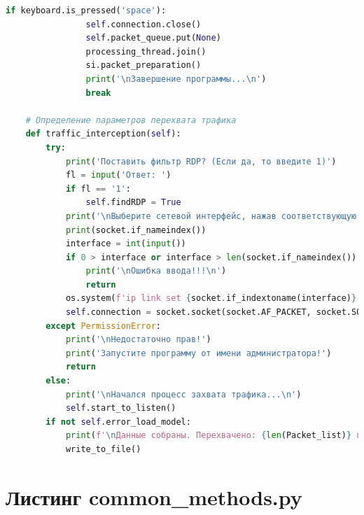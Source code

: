 \documentclass[bachelor, och, coursework]{SCWorks}
\begin{document}
\begin{lstlisting}[language=Python]
            if keyboard.is_pressed('space'):
                self.connection.close()
                self.packet_queue.put(None)
                processing_thread.join()
                si.packet_preparation()
                print('\nЗавершение программы...\n')
                break

    # Определение параметров перехвата трафика
    def traffic_interception(self):
        try:
            print('Поставить фильтр RDP? (Если да, то введите 1)')
            fl = input('Ответ: ')
            if fl == '1':
                self.findRDP = True
            print('\nВыберите сетевой интерфейс, нажав соответствующую цифру:')
            print(socket.if_nameindex())
            interface = int(input())
            if 0 > interface or interface > len(socket.if_nameindex()):
                print('\nОшибка ввода!!!\n')
                return
            os.system(f'ip link set {socket.if_indextoname(interface)} promisc on')
            self.connection = socket.socket(socket.AF_PACKET, socket.SOCK_RAW, socket.ntohs(3))
        except PermissionError:
            print('\nНедостаточно прав!')
            print('Запустите программу от имени администратора!')
            return
        else:
            print('\nНачался процесс захвата трафика...\n')
            self.start_to_listen()
        if not self.error_load_model:
            print(f'\nДанные собраны. Перехвачено: {len(Packet_list)} пакетов(-а)\n')
            write_to_file()
    \end{lstlisting}

    \section{Листинг common\_methods.py}
    
\end{document}
